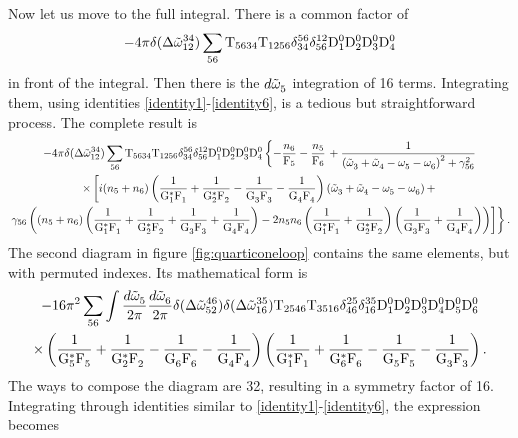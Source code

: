 Now let us move to the full integral. There is a common factor of
\begin{equation*}
    -4\pi\delta(\Delta{\tilde{\omega}}^{34}_{12})\sum_{56}\mathrm{T}_{5634}\mathrm{T}_{1256}\delta^{56}_{34}
    \delta^{12}_{56}\mathrm{D}_1^0\mathrm{D}_2^0\mathrm{D}_3^0\mathrm{D}_4^0
\end{equation*}
in front of the integral. Then there is the $d\tilde{\omega}^{}_5$ integration of 16 terms. Integrating them, using identities \eqref{identity1}-\eqref{identity6},
is a tedious but straightforward process. The complete result is 
\begin{multline}
    -4\pi\delta(\Delta{\tilde{\omega}}^{34}_{12})\sum_{56}\mathrm{T}_{5634}\mathrm{T}_{1256}\delta^{56}_{34}
    \delta^{12}_{56}\mathrm{D}_1^0\mathrm{D}_2^0\mathrm{D}_3^0\mathrm{D}_4^0 \left\{ -\frac{n_6}{\mathrm{F}_5}-\frac{n_5}{\mathrm{F}_6}\right. + 
    \frac{1}{\left( \tilde{\omega}^{}_3 + \tilde{\omega}^{}_4 - \omega^{}_5 - \omega^{}_6\right)^2 + \gamma^2_{56}}\\
    \times \left[
    i(n_5 + n_6)\left(\dfrac{1}{\mathrm{G}_1^*\mathrm{F}_1^{}}+\dfrac{1}{\mathrm{G}_2^*\mathrm{F}_2^{}}-\dfrac{1}{\mathrm{G}_3^{}\mathrm{F}_3^{}}
    -\dfrac{1}{\mathrm{G}_4^{}\mathrm{F}_4^{}}\right)\left( \tilde{\omega}^{}_3 + \tilde{\omega}^{}_4 - \omega^{}_5 - \omega^{}_6\right) + 
    \right.\\
    \left.\left.
    \gamma_{56}\left((n_5 + n_6)\left(\dfrac{1}{\mathrm{G}_1^*\mathrm{F}_1^{}}+\dfrac{1}{\mathrm{G}_2^*\mathrm{F}_2^{}}+\dfrac{1}{\mathrm{G}_3^{}\mathrm{F}_3^{}}
    +\dfrac{1}{\mathrm{G}_4^{}\mathrm{F}_4^{}}\right) - 2n_5n_6 \left(\dfrac{1}{\mathrm{G}_1^*\mathrm{F}_1^{}}+\dfrac{1}{\mathrm{G}_2^*\mathrm{F}_2^{}}\right)\left(\dfrac{1}{\mathrm{G}_3^{}\mathrm{F}_3^{}}
    +\dfrac{1}{\mathrm{G}_4^{}\mathrm{F}_4^{}}\right)\right)
    \right]\right\}.
    \label{schannelfullcontribution}
\end{multline}
The second diagram in figure \ref{fig:quarticoneloop} contains the same elements, but with permuted indexes. Its mathematical form is 
\begin{multline}
    -16\pi^2\sum_{56}\int \frac{d\tilde{\omega}^{}_5}{2\pi}\frac{d\tilde{\omega}^{}_6}{2\pi}\delta(\Delta{\tilde{\omega}}^{46}_{52})\delta(\Delta{\tilde{\omega}}^{35}_{16})\mathrm{T}_{2546}\mathrm{T}_{3516}\delta^{25}_{46}
    \delta^{35}_{16}\mathrm{D}_1^0\mathrm{D}_2^0\mathrm{D}_3^0\mathrm{D}_4^0\mathrm{D}_5^0\mathrm{D}_6^0 \\ 
    \times \left(\dfrac{1}{\mathrm{G}_5^*\mathrm{F}_5^{}}+\dfrac{1}{\mathrm{G}_2^*\mathrm{F}_2^{}}-\dfrac{1}{\mathrm{G}_6^{}\mathrm{F}_6^{}}
    -\dfrac{1}{\mathrm{G}_4^{}\mathrm{F}_4^{}}\right)\left(\dfrac{1}{\mathrm{G}_1^*\mathrm{F}_1^{}}+\dfrac{1}{\mathrm{G}_6^*\mathrm{F}_6^{}}-\dfrac{1}{\mathrm{G}_5^{}\mathrm{F}_5^{}}
    -\dfrac{1}{\mathrm{G}_3^{}\mathrm{F}_3^{}}\right).
    \label{tchannel}
\end{multline}
The ways to compose the diagram are 32, resulting in a symmetry factor of 16. Integrating through 
identities similar to \eqref{identity1}-\eqref{identity6}, the expression becomes
